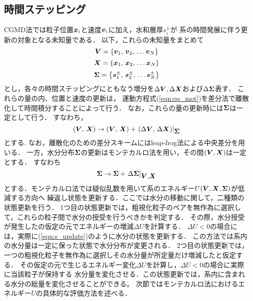 \subsection{時間ステッピング}
CGMD法では粒子位置$\mbox{\boldmath $x$}_i$と速度$\mbox{\boldmath $v$}_i$に加え，水和層厚$s_i^\pm$が
系の時間発展に伴う更新の対象となる未知量である．
以下，これらの未知量をまとめて
\begin{equation}
	\mbox{\boldmath $V$}=\left\{ \mbox{\boldmath $v$}_1,\, \mbox{\boldmath $v$}_2,\, \dots \mbox{\boldmath $v$}_N \right\}
	\label{eqn:defV}
\end{equation}
\begin{equation}
	\mbox{\boldmath $X$}=\left\{ \mbox{\boldmath $x$}_1,\, \mbox{\boldmath $x$}_2,\, \dots \mbox{\boldmath $x$}_N \right\}
	\label{eqn:defV}
\end{equation}
\begin{equation}
	\mbox{\boldmath $\Sigma$}=\left\{ \mbox{\boldmath $s$}_1^\pm,\, \mbox{\boldmath $s$}_2^\pm,\, \dots \mbox{\boldmath $s$}_N^\pm \right\}
	\label{eqn:defV}
\end{equation}
とし，各々の時間ステッピングにともなう増分を$\Delta \mbox{\boldmath $V$},\Delta \mbox{\boldmath $X$}$および$\Delta \mbox{\boldmath $\Sigma$}$表す．
これらの量の内、位置と速度の更新は，
運動方程式(\ref{eqn:eq_mot})を差分法で離散化して時間積分することによって行う．
なお，これらの量の更新時には$\mbox{\boldmath $\Sigma$}$は一定として行う．
すなわち，
\begin{equation}
	\left( \mbox{\boldmath $V$},\,\mbox{\boldmath $X$} \right)
	\rightarrow 
	\left( \mbox{\boldmath $V$},\,\mbox{\boldmath $X$} \right)
	+
	\left. \left( \Delta \mbox{\boldmath $V$},\, \Delta \mbox{\boldmath $X$} \right) \right|_{\mbox{\boldmath $\Sigma$}}
	\label{eqn:vx_update}
\end{equation}
とする. なお，離散化のための差分スキームにはleap-frog法による中央差分を用いる．
一方，水分分布$\mbox{\boldmath $\Sigma$}$の更新はモンテカルロ法を用い，その間$(\mbox{\boldmath $V$},\mbox{\boldmath $X$})$は一定とする．
すなわち
\begin{equation}
	\mbox{\boldmath $\Sigma$} \rightarrow \mbox{\boldmath $\Sigma$} + \left. \Delta \mbox{\boldmath $\Sigma$} \right|_{\mbox{\boldmath $V$},\mbox{\boldmath $X$}}
	\label{eqn:s_update}
\end{equation}
とする．モンテカルロ法では疑似乱数を用いて系のエネルギー$U(\mbox{\boldmath $V$},\mbox{\boldmath $X$},\mbox{\boldmath $\Sigma$})$が低減する方向へ
繰返し状態を更新する．ここでは水分の移動に関して，二種類の状態更新を行う．
1つ目の状態更新では，粗視化粒子のペアを無作為に選択して，これらの粒子間で水分の授受を行うべきかを判定する．
その際，水分授受が発生したの仮定の元でエネルギーの増減$\Delta U$を計算する．
$\Delta U<0$の場合には，実際に(\ref{eqn:s_update})のように水分の状態を更新する．
この方法では系内の水分量は一定に保った状態で水分分布が変更される．
2つ目の状態更新では，一つの粗視化粒子を無作為に選択しその水分量が所定量だけ増減したと仮定する．
その仮定の元で生じるエネルギー変化$\Delta U$を計算し，$\Delta U<0$の場合に実際に当該粒子が保持する
水分量を変化させる．この状態更新では，系内に含まれる水分の総量を変化させることができる。
次節ではモンテカルロ法におけるエネルギー$U$の具体的な評価方法を述べる．
